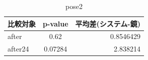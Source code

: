       \begin{table}[H]
        \centering
        \caption{pose2}
        \begin{tabular}{lcr}
        \hline
        \textbf{比較対象} & \textbf{p-value} & \textbf{平均差(システム-鏡)} \\ \hline
        after & 0.62 & 0.8546429 \\ \hline
        after24 & 0.07284 & 2.838214 \\ \hline
        \end{tabular}
        \label{table:pose2_practice_p_value}
        \end{table}


